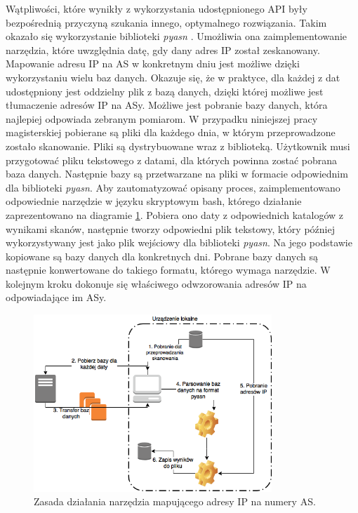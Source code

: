 Wątpliwości, które wynikły z wykorzystania udostępnionego API były bezpośrednią przyczyną szukania innego, optymalnego rozwiązania.
Takim okazało się wykorzystanie biblioteki \textit{pyasn} \cite{pyasn}. Umożliwia ona zaimplementowanie narzędzia, które uwzględnia
datę, gdy dany adres IP został zeskanowany. Mapowanie adresu IP na AS w konkretnym dniu jest możliwe dzięki wykorzystaniu wielu baz
danych. Okazuje się, że w praktyce, dla każdej z dat udostępniony jest oddzielny plik z bazą danych, dzięki której możliwe jest
tłumaczenie adresów IP na ASy. Możliwe jest pobranie bazy danych, która najlepiej odpowiada zebranym pomiarom. W przypadku niniejszej
pracy magisterskiej pobierane są pliki dla każdego dnia, w którym przeprowadzone zostało skanowanie. Pliki są dystrybuowane wraz z
biblioteką. Użytkownik musi przygotować pliku tekstowego z datami, dla których powinna zostać
pobrana baza danych. Następnie bazy są przetwarzane na pliki w formacie odpowiednim dla biblioteki \textit{pyasn}. Aby zautomatyzować
opisany proces, zaimplementowano odpowiednie narzędzie w języku skryptowym bash, którego działanie zaprezentowano na diagramie
\ref{fig:netcat}. Pobiera ono daty z odpowiednich katalogów z wynikami
skanów, następnie tworzy odpowiedni plik tekstowy, który później wykorzystywany jest jako plik wejściowy dla biblioteki \textit{pyasn}.
Na jego podstawie kopiowane są bazy danych dla konkretnych dni. Pobrane bazy danych są następnie konwertowane do takiego formatu,
którego wymaga narzędzie. W kolejnym kroku dokonuje się właściwego odwzorowania adresów IP na odpowiadające im ASy.
\begin{figure}[h!]
	\centering
	\includegraphics[width=0.8\textwidth]{image/netcat}
	\caption{Zasada działania narzędzia mapującego adresy IP na numery AS.}
	\label{fig:netcat}
\end{figure}

